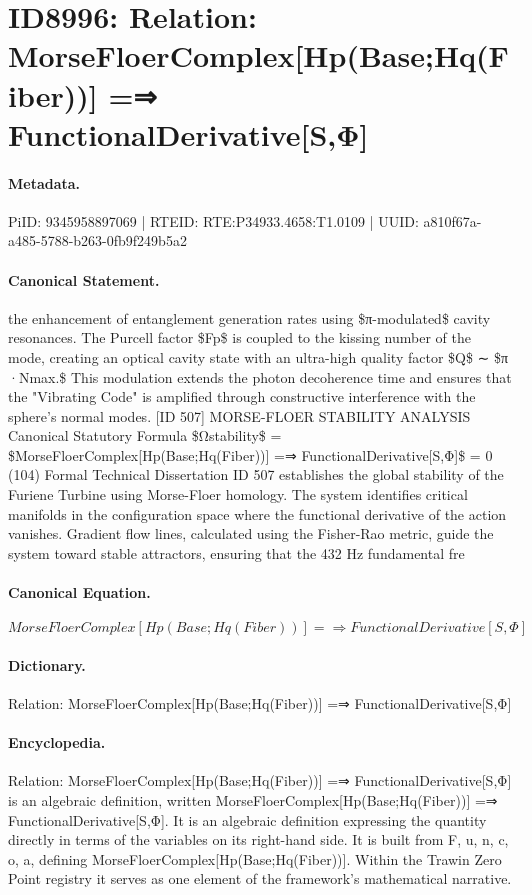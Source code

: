 \section*{ID8996: Relation: MorseFloerComplex[Hp(Base;Hq(Fiber))] =⇒ FunctionalDerivative[S,Φ]}
\paragraph{Metadata.}
PiID: 9345958897069 | RTEID: RTE:P34933.4658:T1.0109 | UUID: a810f67a-a485-5788-b263-0fb9f249b5a2

\paragraph{Canonical Statement.}
the enhancement of entanglement generation rates using \$π-modulated\$ cavity resonances. The Purcell factor \$Fp\$ is coupled to the kissing number of the mode, creating an optical cavity state with an ultra-high quality factor \$Q\$ ∼ \$π ·Nmax.\$ This modulation extends the photon decoherence time and ensures that the "Vibrating Code" is amplified through constructive interference with the sphere’s normal modes. [ID 507] MORSE-FLOER STABILITY ANALYSIS Canonical Statutory Formula \$Ωstability\$ = \$MorseFloerComplex[Hp(Base;Hq(Fiber))] =⇒ FunctionalDerivative[S,Φ]\$ = 0 (104) Formal Technical Dissertation ID 507 establishes the global stability of the Furiene Turbine using Morse-Floer homology. The system identifies critical manifolds in the configuration space where the functional derivative of the action vanishes. Gradient flow lines, calculated using the Fisher-Rao metric, guide the system toward stable attractors, ensuring that the 432 Hz fundamental fre

\paragraph{Canonical Equation.}
\[
MorseFloerComplex[Hp(Base;Hq(Fiber))] =⇒ FunctionalDerivative[S,Φ]
\]

\paragraph{Dictionary.}
Relation: MorseFloerComplex[Hp(Base;Hq(Fiber))] =⇒ FunctionalDerivative[S,Φ]

\paragraph{Encyclopedia.}
Relation: MorseFloerComplex[Hp(Base;Hq(Fiber))] =⇒ FunctionalDerivative[S,Φ] is an algebraic definition, written MorseFloerComplex[Hp(Base;Hq(Fiber))] =⇒ FunctionalDerivative[S,Φ]. It is an algebraic definition expressing the quantity directly in terms of the variables on its right-hand side. It is built from F, u, n, c, o, a, defining MorseFloerComplex[Hp(Base;Hq(Fiber))]. Within the Trawin Zero Point registry it serves as one element of the framework's mathematical narrative.
